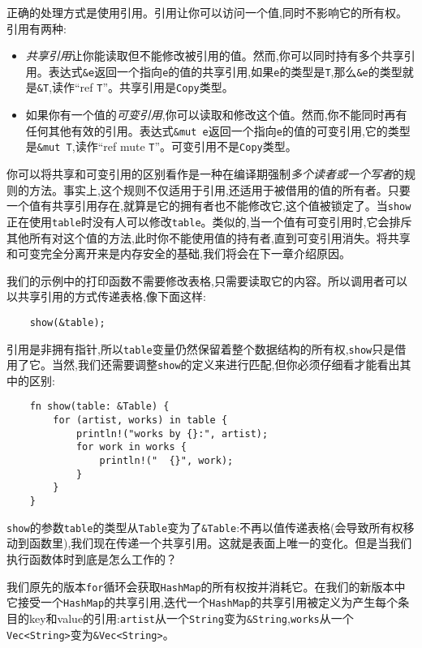正确的处理方式是使用引用。引用让你可以访问一个值,同时不影响它的所有权。引用有两种:
\begin{itemize}
    \item \emph{共享引用}让你能读取但不能修改被引用的值。然而,你可以同时持有多个共享引用。表达式\texttt{\&e}返回一个指向\texttt{e}的值的共享引用,如果\texttt{e}的类型是\texttt{T},那么\texttt{\&e}的类型就是\texttt{\&T},读作“ref \texttt{T}”。共享引用是\texttt{Copy}类型。
    \item 如果你有一个值的\emph{可变引用},你可以读取和修改这个值。然而,你不能同时再有任何其他有效的引用。表达式\texttt{\&mut e}返回一个指向\texttt{e}的值的可变引用,它的类型是\texttt{\&mut T},读作“ref mute \texttt{T}”。可变引用不是\texttt{Copy}类型。
\end{itemize}

你可以将共享和可变引用的区别看作是一种在编译期强制\emph{多个读者或一个写者}的规则的方法。事实上,这个规则不仅适用于引用,还适用于被借用的值的所有者。只要一个值有共享引用存在,就算是它的拥有者也不能修改它,这个值被锁定了。当\texttt{show}正在使用\texttt{table}时没有人可以修改\texttt{table}。类似的,当一个值有可变引用时,它会排斥其他所有对这个值的方法,此时你不能使用值的持有者,直到可变引用消失。将共享和可变完全分离开来是内存安全的基础,我们将会在下一章介绍原因。

我们的示例中的打印函数不需要修改表格,只需要读取它的内容。所以调用者可以以共享引用的方式传递表格,像下面这样:
\begin{verbatim}
    show(&table);
\end{verbatim}

引用是非拥有指针,所以\texttt{table}变量仍然保留着整个数据结构的所有权,\texttt{show}只是借用了它。当然,我们还需要调整\texttt{show}的定义来进行匹配,但你必须仔细看才能看出其中的区别:

\begin{verbatim}
    fn show(table: &Table) {
        for (artist, works) in table {
            println!("works by {}:", artist);
            for work in works {
                println!("  {}", work);
            }
        }
    }
\end{verbatim}

\texttt{show}的参数\texttt{table}的类型从\texttt{Table}变为了\texttt{\&Table}:不再以值传递表格(会导致所有权移动到函数里),我们现在传递一个共享引用。这就是表面上唯一的变化。但是当我们执行函数体时到底是怎么工作的？

我们原先的版本\texttt{for}循环会获取\texttt{HashMap}的所有权按并消耗它。在我们的新版本中它接受一个\texttt{HashMap}的共享引用,迭代一个\texttt{HashMap}的共享引用被定义为产生每个条目的key和value的引用:\texttt{artist}从一个\texttt{String}变为\texttt{\&String},\texttt{works}从一个\texttt{Vec<String>}变为\texttt{\&Vec<String>}。


